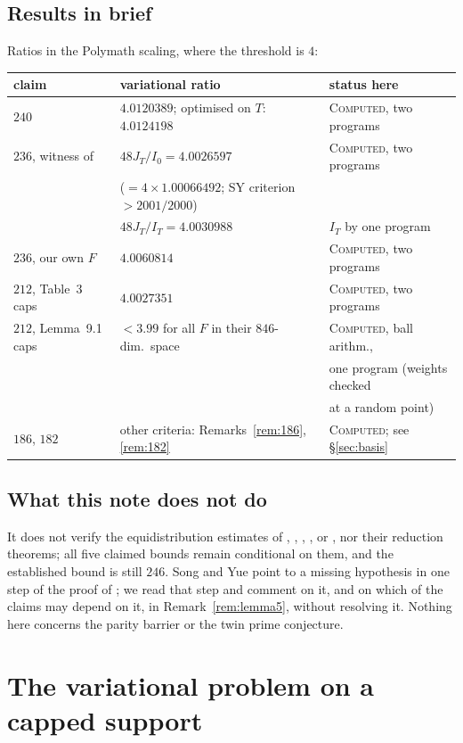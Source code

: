 \documentclass[11pt]{amsart}
\theoremstyle{definition}
\theoremstyle{remark}
\newcommand{\lbl}[1]{\textup{\textsc{#1}}}
\begin{document}
\subsection*{Results in brief}
Ratios in the Polymath scaling, where the threshold is $4$:
\begin{center}\small
\begin{tabular}{@{}lll@{}}
\toprule
claim & variational ratio & status here\\
\midrule
$240$ & $4.0120389$; optimised on $T$: $4.0124198$ & \lbl{Computed}, two programs\\
$236$, witness of \cite{SY26} & $48J_T/I_0=4.0026597$ & \lbl{Computed}, two programs\\
 & \quad($=4\times1.00066492$; SY criterion $>2001/2000$) & \\
 & $48J_T/I_T=4.0030988$ & $I_T$ by one program\\
$236$, our own $F$ & $4.0060814$ & \lbl{Computed}, two programs\\
$212$, Table~3 caps & $4.0027351$ & \lbl{Computed}, two programs\\
$212$, Lemma~9.1 caps & $<3.99$ for all $F$ in their $846$-dim.\ space & \lbl{Computed}, ball arithm.,\\
 & & one program (weights checked\\
 & & at a random point)\\
$186$, $182$ & other criteria: Remarks~\ref{rem:186}, \ref{rem:182} & \lbl{Computed}; see \S\ref{sec:basis}\\
\bottomrule
\end{tabular}
\end{center}

\subsection*{What this note does not do}
It does not verify the equidistribution estimates of \cite{Sta26},
\cite{Kin26}, \cite{SY26}, \cite{Cha26}, \cite{OAI26} or \cite{Sha26}, nor
their reduction theorems; all five claimed bounds remain conditional on them, and the established bound is
still $246$. Song and Yue
\cite[Remark~4.23]{SY26} point to a missing hypothesis in one step of the
proof of \cite[Lemma~5]{Sta26}; we read that step and comment on it, and on
which of the claims may depend on it, in Remark~\ref{rem:lemma5}, without
resolving it. Nothing here concerns the
parity barrier or the twin prime conjecture.

\section{The variational problem on a capped support}
\end{document}
